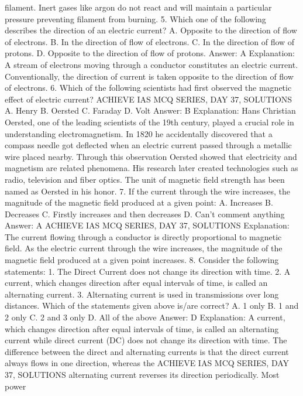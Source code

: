 filament. Inert gases like argon do not react and will maintain a
particular pressure preventing filament from burning.
5. Which one of the following describes the direction of an
electric current?
A. Opposite to the direction of flow of electrons.
B. In the direction of flow of electrons.
C. In the direction of flow of protons.
D. Opposite to the direction of flow of protons.
Answer: A
Explanation: A stream of electrons moving through a conductor
constitutes an electric current. Conventionally, the direction of
current is taken opposite to the direction of flow of electrons.
6. Which of the following scientists had first observed the
magnetic effect of electric current?
ACHIEVE IAS MCQ SERIES, DAY 37, SOLUTIONS
A. Henry
B. Oersted
C. Faraday
D. Volt
Answer: B
Explanation: Hans Christian Oersted, one of the leading scientists
of the 19th century, played a crucial role in understanding
electromagnetism. In 1820 he accidentally discovered that a
compass needle got deflected when an electric current passed
through a metallic wire placed nearby. Through this observation
Oersted showed that electricity and magnetism are related
phenomena. His research later created technologies such as radio,
television and fiber optics. The unit of magnetic field strength has
been named as Oersted in his honor.
7. If the current through the wire increases, the magnitude of
the magnetic field produced at a given point:
A. Increases
B. Decreases
C. Firstly increases and then decreases
D. Can’t comment anything
Answer: A
ACHIEVE IAS MCQ SERIES, DAY 37, SOLUTIONS
Explanation: The current flowing through a conductor is directly
proportional to magnetic field. As the electric current through the
wire increases, the magnitude of the magnetic field produced at a
given point increases.
8. Consider the following statements:
1. The Direct Current does not change its direction with time.
2. A current, which changes direction after equal intervals of time,
is called an alternating current.
3. Alternating current is used in transmissions over long distances.
Which of the statements given above is/are correct?
A. 1 only
B. 1 and 2 only
C. 2 and 3 only
D. All of the above
Answer: D
Explanation: A current, which changes direction after equal
intervals of time, is called an alternating current while direct
current (DC) does not change its direction with time.
The difference between the direct and alternating currents is that
the direct current always flows in one direction, whereas the
ACHIEVE IAS MCQ SERIES, DAY 37, SOLUTIONS
alternating current reverses its direction periodically. Most power

